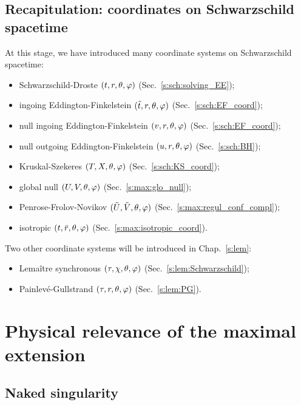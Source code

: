 \subsection{Recapitulation: coordinates on Schwarzschild spacetime}

At this stage, we have introduced many coordinate systems on Schwarzschild spacetime:
\begin{itemize}
\item Schwarzschild-Droste $(t,r,\theta,\varphi)$ (Sec.~\ref{s:sch:solving_EE});
\item ingoing Eddington-Finkelstein $(\tilde{t},r,\theta,\varphi)$ (Sec.~\ref{s:sch:EF_coord});
\item null ingoing Eddington-Finkelstein $(v,r,\theta,\varphi)$ (Sec.~\ref{s:sch:EF_coord});
\item null outgoing Eddington-Finkelstein $(u,r,\theta,\varphi)$ (Sec.~\ref{s:sch:BH});
\item Kruskal-Szekeres $(T,X,\theta,\varphi)$ (Sec.~\ref{s:sch:KS_coord});
\item global null $(U,V,\theta,\varphi)$ (Sec.~\ref{s:max:glo_null});
\item Penrose-Frolov-Novikov $(\tilde{U},\tilde{V},\theta,\varphi)$ (Sec.~\ref{s:max:regul_conf_compl});
\item isotropic $(t,\bar{r},\theta,\varphi)$ (Sec.~\ref{s:max:isotropic_coord}).
\end{itemize}
Two other coordinate systems will be introduced in Chap.~\ref{s:lem}:
\begin{itemize}
\item Lemaître synchronous $(\tau,\chi,\theta,\varphi)$ (Sec.~\ref{s:lem:Schwarzschild});
\item Painlevé-Gullstrand $(\tau,r,\theta,\varphi)$ (Sec.~\ref{s:lem:PG}).
\end{itemize}


\section{Physical relevance of the maximal extension} \label{s:max:relevance}

\subsection{Naked singularity} \label{s:max:naked_sing}

